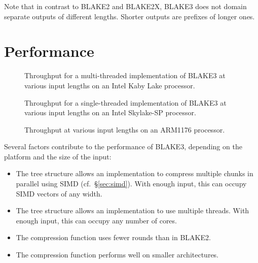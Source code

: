 \documentclass[11pt,notitlepage,a4paper]{article}
\begin{document}
Note that in contrast to BLAKE2 and BLAKE2X, BLAKE3 does not domain separate
outputs of different lengths. Shorter outputs are prefixes of longer ones.

\section{Performance}\label{sec:performance}

\begin{figure}[h]
\centering
%

\caption{Throughput for a multi-threaded implementation of BLAKE3 at various
    input lengths on an Intel Kaby Lake processor.}
\label{fig:avx2_rayon}
\end{figure}

\begin{figure}[h]
\centering
%

\caption{Throughput for a single-threaded implementation of BLAKE3 at various
    input lengths on an Intel Skylake-SP processor.}%
\label{fig:avx512_c}
\end{figure}

\begin{figure}[h]
\centering
%

\caption{Throughput at various input lengths on an ARM1176 processor.}%
\label{fig:rpizero}
\end{figure}

Several factors contribute to the performance of BLAKE3, depending on the
platform and the size of the input:

\begin{itemize}
    \item The tree structure allows an implementation to compress multiple
        chunks in parallel using SIMD (cf.~\S\ref{sec:simd}). With enough
        input, this can occupy SIMD vectors of any width.
    \item The tree structure allows an implementation to use multiple threads.
        With enough input, this can occupy any number of cores.
    \item The compression function uses fewer rounds than in BLAKE2.
    \item The compression function performs well on smaller architectures.
\end{itemize}
\end{document}
